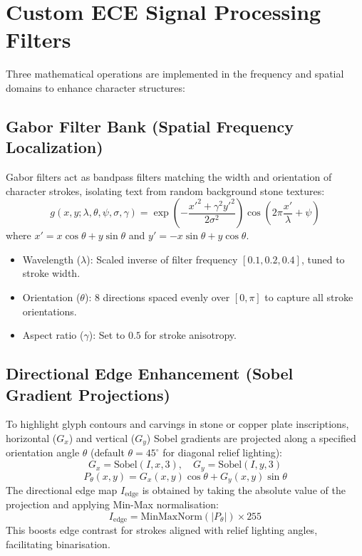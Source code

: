 \section{Custom ECE Signal Processing Filters}

Three mathematical operations are implemented in the frequency and spatial domains to enhance character structures:

\subsection{Gabor Filter Bank (Spatial Frequency Localization)}
Gabor filters act as bandpass filters matching the width and orientation of character strokes, isolating text from random background stone textures:
\begin{equation}
g(x,y;\lambda,\theta,\psi,\sigma,\gamma) = \exp\left(-\frac{x'^2 + \gamma^2 y'^2}{2\sigma^2}\right) \cos\left(2\pi\frac{x'}{\lambda} + \psi\right)
\end{equation}
where $x' = x\cos\theta + y\sin\theta$ and $y' = -x\sin\theta + y\cos\theta$.
\begin{itemize}
	\item Wavelength ($\lambda$): Scaled inverse of filter frequency $[0.1, 0.2, 0.4]$, tuned to stroke width.
	\item Orientation ($\theta$): 8 directions spaced evenly over $[0, \pi]$ to capture all stroke orientations.
	\item Aspect ratio ($\gamma$): Set to $0.5$ for stroke anisotropy.
\end{itemize}

\subsection{Directional Edge Enhancement (Sobel Gradient Projections)}
To highlight glyph contours and carvings in stone or copper plate inscriptions, horizontal ($G_x$) and vertical ($G_y$) Sobel gradients are projected along a specified orientation angle $\theta$ (default $\theta = 45^\circ$ for diagonal relief lighting):
\begin{equation}
G_x = \text{Sobel}(I, x, 3), \quad G_y = \text{Sobel}(I, y, 3)
\end{equation}
\begin{equation}
P_{\theta}(x, y) = G_x(x,y) \cos\theta + G_y(x,y) \sin\theta
\end{equation}
The directional edge map $I_{\text{edge}}$ is obtained by taking the absolute value of the projection and applying Min-Max normalisation:
\begin{equation}
I_{\text{edge}} = \text{MinMaxNorm}\left(|P_\theta|\right) \times 255
\end{equation}
This boosts edge contrast for strokes aligned with relief lighting angles, facilitating binarisation.

